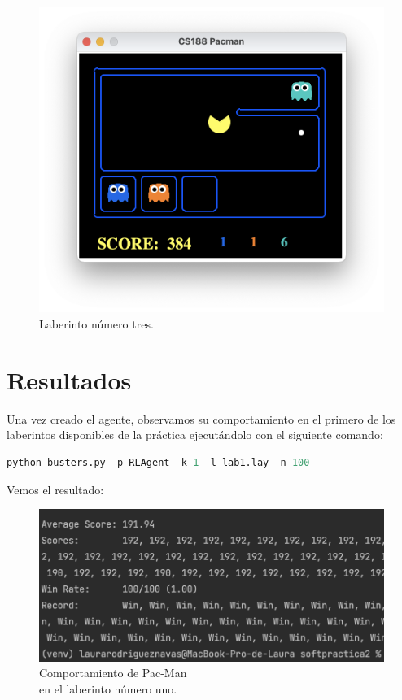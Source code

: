\documentclass[11pt]{exam}
\begin{document}
\begin{figure}[H]
	\centering
	\includegraphics[scale=0.35]{lab3}
	\caption{Laberinto número tres.}
	\label{lab3}
\end{figure}


\section{Resultados}\label{resultados}

Una vez creado el agente, observamos su comportamiento en el primero de los laberintos disponibles de la práctica ejecutándolo con el siguiente comando:

\begin{lstlisting}[language=python, basicstyle=\footnotesize]
	python busters.py -p RLAgent -k 1 -l lab1.lay -n 100
\end{lstlisting}
\vspace*{3mm}

Vemos el resultado:

\begin{figure}[H]
	\centering
	\includegraphics[scale=0.6]{result_lab1}
	\caption{Comportamiento de Pac-Man \\ en el laberinto número uno.}
	\label{result_lab1}
\end{figure}
\end{document}
